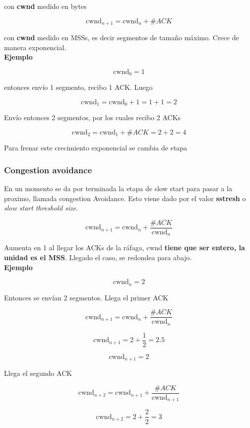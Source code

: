 \documentclass[titlepage,a4paper]{article}
\begin{document}
con \textbf{cwnd} medido en bytes


$$\mathrm{cwnd}_{n+1} = \mathrm{cwnd}_n + \#ACK $$

con \textbf{cwnd} medido en MSSs, es decir segmentos de tamaño máximo. Crece de manera exponencial. \\

\textbf{Ejemplo}



$$ \mathrm{cwnd}_0 = 1 $$

entonces envío 1 segmento, recibo 1 ACK. Luego 

$$ \mathrm{cwnd}_1 = \mathrm{cwnd}_0 + 1 = 1 + 1 = 2 $$

Envío entonces 2 segmentos, por los cuales recibo 2 ACKs

$$ \mathrm{cwnd}_2 = \mathrm{cwnd}_1 + \#ACK = 2 + 2 = 4 $$

Para frenar este crecimiento exponencial se cambia de etapa

\subsubsection{Congestion avoidance}

En un momento se da por terminada la etapa de slow start para pasar a la proximo, llamada congestion Avoidance. Esto viene dado por el valor \textbf{sstresh} o \textit{slow start threshold size}.

$$ \mathrm{cwnd}_{n+1} = \mathrm{cwnd}_n + \frac{\#ACK}{\mathrm{cwnd}_n} $$

Aumenta en 1 al llegar los ACKs de la ráfaga, cwnd \textbf{tiene que ser entero, la unidad es el MSS}. Llegado el caso, se redondea para abajo. \\

\textbf{Ejemplo}

$$\mathrm{cwnd}_n = 2$$

Entonces se envían 2 segmentos. Llega el primer ACK

$$ \mathrm{cwnd}_{n+1} = \mathrm{cwnd}_n +  \frac{\#ACK}{\mathrm{cwnd}_n} $$

$$ \mathrm{cwnd}_{n+1} = 2 +  \frac{1}{2} = 2.5 $$

$$ \mathrm{cwnd}_{n+1} = 2 $$

Llega el segundo ACK

$$ \mathrm{cwnd}_{n+2} = \mathrm{cwnd}_{n+1} +  \frac{\#ACK}{\mathrm{cwnd}_{n+1}} $$

$$ \mathrm{cwnd}_{n+2} = 2 +  \frac{2}{2} = 3 $$
\end{document}
